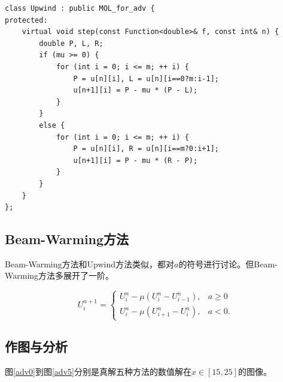 \documentclass{ctexart}
\begin{document}
\begin{lstlisting}
class Upwind : public MOL_for_adv {
protected:
	virtual void step(const Function<double>& f, const int& n) {
		double P, L, R;
		if (mu >= 0) {
			for (int i = 0; i <= m; ++ i) {
				P = u[n][i], L = u[n][i==0?m:i-1];
				u[n+1][i] = P - mu * (P - L);
			}
		}
		else {
			for (int i = 0; i <= m; ++ i) {
				P = u[n][i], R = u[n][i==m?0:i+1];
				u[n+1][i] = P - mu * (R - P);
			}
		}
	}
};
\end{lstlisting}

\subsection{Beam-Warming方法}

Beam-Warming方法和Upwind方法类似，都对$a$的符号进行讨论。但Beam-Warming方法多展开了一阶。

\begin{equation}
U^{n+1}_i = \left\{
\begin{aligned}
	U^n_i - \mu(U^n_i - U^n_{i-1}), & a\geq 0\\
	U^n_i - \mu(U^n_{i+1} - U^n_i), & a < 0.
\end{aligned}
\right.
\end{equation}

\subsection{作图与分析}

图\ref{adv0}到图\ref{adv5}分别是真解五种方法的数值解在$x\in[15,25]$的图像。
\end{document}
